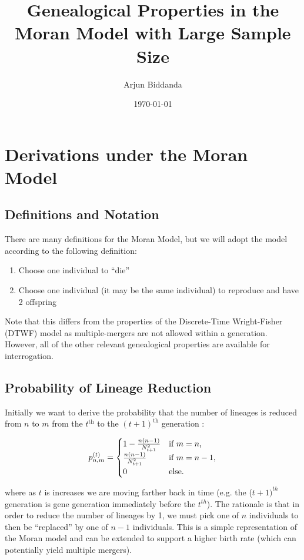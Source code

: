 \documentclass[10.5pt]{article}
\title{Genealogical Properties in the Moran Model with Large Sample Size}
\author{Arjun Biddanda}
\date{\today}
\begin{document}
\maketitle

\section{Derivations under the Moran Model}

\subsection{Definitions and Notation}

There are many definitions for the Moran Model, but we will adopt the model according to the following definition:

\begin{enumerate}
	\item Choose one individual to ``die''
	\item Choose one individual (it may be the same individual) to reproduce and have 2 offspring
\end{enumerate}

Note that this differs from the properties of the Discrete-Time Wright-Fisher (DTWF) model as multiple-mergers are not allowed within a generation. However, all of the other relevant genealogical properties are available for interrogation.

\subsection{Probability of Lineage Reduction}
Initially we want to derive the probability that the number of lineages is reduced from $n$ to $m$ from the $t^{\text{th}}$ to the $(t+1)^{\text{th}}$ generation :

\begin{equation}
	p^{(t)}_{n,m} =
	\begin{cases} 1 - \frac{n(n-1)}{N^2_{t+1}}  & \text{if $m = n$,}
		\\
		\frac{n(n-1)}{N^2_{t+1}} &\text{if $ m = n - 1$,}
		\\
		0 &\text{else.}
	\end{cases}
\end{equation}

where as $t$ is increases we are moving farther back in time (e.g. the ($t+1)^{th}$ generation is gene generation immediately before the $t^{th}$). The rationale is that in order to reduce the number of lineages by 1, we must pick one of $n$ individuals to then be ``replaced'' by one of $n-1$ individuals. This is a simple representation of the Moran model and can be extended to support a higher birth rate (which can potentially yield multiple mergers).
\end{document}

